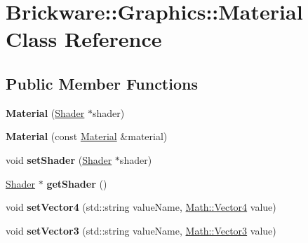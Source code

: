 \hypertarget{classBrickware_1_1Graphics_1_1Material}{}\section{Brickware\+:\+:Graphics\+:\+:Material Class Reference}
\label{classBrickware_1_1Graphics_1_1Material}
\subsection*{Public Member Functions}
\begin{DoxyCompactItemize}
\item 
\hypertarget{classBrickware_1_1Graphics_1_1Material_a5f6b3e7a54f37efac92aab314371f3a8}{}{\bfseries Material} (\hyperlink{classBrickware_1_1Graphics_1_1Shader}{Shader} $\ast$shader)\label{classBrickware_1_1Graphics_1_1Material_a5f6b3e7a54f37efac92aab314371f3a8}

\item 
\hypertarget{classBrickware_1_1Graphics_1_1Material_a77abdb34ae3b295419ce3f225407f1d4}{}{\bfseries Material} (const \hyperlink{classBrickware_1_1Graphics_1_1Material}{Material} \&material)\label{classBrickware_1_1Graphics_1_1Material_a77abdb34ae3b295419ce3f225407f1d4}

\item 
\hypertarget{classBrickware_1_1Graphics_1_1Material_a6a731acc226edd48779db6b9810f6c76}{}void {\bfseries set\+Shader} (\hyperlink{classBrickware_1_1Graphics_1_1Shader}{Shader} $\ast$shader)\label{classBrickware_1_1Graphics_1_1Material_a6a731acc226edd48779db6b9810f6c76}

\item 
\hypertarget{classBrickware_1_1Graphics_1_1Material_a0f40c8c0c61317f2100bb4d91ab3841d}{}\hyperlink{classBrickware_1_1Graphics_1_1Shader}{Shader} $\ast$ {\bfseries get\+Shader} ()\label{classBrickware_1_1Graphics_1_1Material_a0f40c8c0c61317f2100bb4d91ab3841d}

\item 
\hypertarget{classBrickware_1_1Graphics_1_1Material_a7729849f66ea1640b74a19fc2746fae5}{}void {\bfseries set\+Vector4} (std\+::string value\+Name, \hyperlink{classBrickware_1_1Math_1_1Vector4}{Math\+::\+Vector4} value)\label{classBrickware_1_1Graphics_1_1Material_a7729849f66ea1640b74a19fc2746fae5}

\item 
\hypertarget{classBrickware_1_1Graphics_1_1Material_a7ff8728e357f44e4a067b655257da2b0}{}void {\bfseries set\+Vector3} (std\+::string value\+Name, \hyperlink{classBrickware_1_1Math_1_1Vector3}{Math\+::\+Vector3} value)\label{classBrickware_1_1Graphics_1_1Material_a7ff8728e357f44e4a067b655257da2b0}


\end{DoxyCompactItemize}
